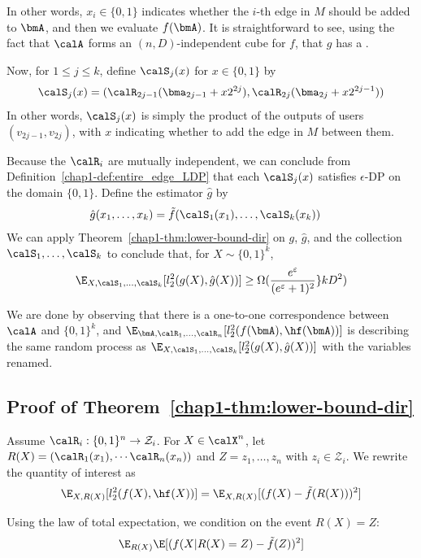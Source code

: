 In other words, 
$x_i \in \{0,1\}$ indicates whether the $i$-th edge in $M$ should be
added to $\bmA$, and then we evaluate $f(\bmA)$. It is straightforward to see,
using the fact that $\calA$ forms an $(n,D)$-independent cube for $f$, that $g$
has a 
.

Now, for $1 \leq j \leq k$, define $\calS_j(x)$ for $x \in \{0,1\}$ by
\[
  \calS_j(x) = (\calR_{2j-1}(\bma_{2j-1} + x2^{2j}),
  \calR_{2j}(\bma_{2j} + x2^{2j-1}))
\]
In other words, $\calS_j(x)$ is simply the product of the outputs of users
$(v_{2j-1}, v_{2j})$, with $x$ indicating whether to add the edge in $M$ between them.

Because the $\calR_i$ are mutually independent, we can conclude from
Definition~\ref{chap1-def:entire_edge_LDP} that each $\calS_j(x)$ satisfies $\epsilon$-DP
on the domain $\{0,1\}$. Define the estimator $\hat{g}$ by
\begin{align*}
  \hat{g}(x_1, \ldots, x_k) &= \tilde{f}(\calS_1(x_1), \ldots,
  \calS_{k}(x_k))
\end{align*}
We can apply Theorem~\ref{chap1-thm:lower-bound-dir} on $g$, $\hat{g}$, and
the collection $\calS_1,\ldots, \calS_k$ to conclude that, for $X \sim
\{0,1\}^k$,
\[
  \E_{X,\calS_1, \ldots, \calS_k}[l_2^2(g(X), \hat{g}(X) )] \geq \Omega(
  \frac{e^{\varepsilon}}{(e^{\varepsilon}+1)^2}\}kD^2)
\]

We are done by observing that there is a one-to-one correspondence between
$\calA$ and $\{0,1\}^k$, and $\E_{\bmA, \calR_1, \ldots,
\calR_n}[l_2^2(f(\bmA), \hf(\bmA))]$ is describing the same random process as
$\E_{X, \calS_1, \ldots, \calS_k}[l_2^2(g(X), \hat{g}(X) )]$ with the variables
renamed.

\subsection{Proof of
Theorem~\ref{chap1-thm:lower-bound-dir}}\label{chap1-sub:proof_thm_lower-bound-dir}

Assume $\calR_i : \{0,1\}^n \rightarrow \mathcal{Z}_i$.
For $X \in \calX^n$, let $R(X) = (\calR_1(x_1), \cdots \calR_n(x_n))$ and
$Z = z_1, \ldots, z_n$ with $z_i \in \mathcal{Z}_i$. 
We rewrite the quantity of interest as
\[
  \E_{X, R(X)}[l_2^2(f(X), \hf(X))] = \E_{X, R(X)}[(f(X)- \tilde{f}(R(X)))^2]
\]

Using the law of total expectation, we condition on the event $R(X) = Z$:
\begin{align*}
  \E_{R(X)} \E[(f(X|R(X)=Z) - \tilde{f}(Z) )^2]
\end{align*}

